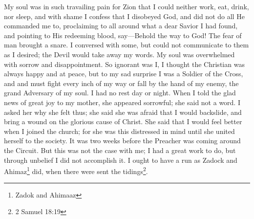 My soul was in such travailing pain for Zion that I could neither work, eat, drink, nor sleep, and with shame I confess that I disobeyed God, and did not do all He commanded me to, proclaiming to all around what a dear Savior I had found, and pointing to His redeeming blood, say---Behold the way to God!
The fear of man brought a snare.
I conversed with some, but could not communicate to them as I desired; the Devil would take away my words.
My soul was overwhelmed with sorrow and disappointment.
So ignorant was I, I thought the Christian was always happy and at peace, but to my sad surprise I was a Soldier of the Cross, and and must fight every inch of my way or fall by the hand of my enemy, the grand Adversary of my soul.
I had no rest day or night.
When I told the glad news of great joy to my mother, she appeared sorrowful; she said not a word.
I asked her why she felt thus; she said she was afraid that I would backslide, and bring a wound on the glorious cause of Christ.
She said that I would feel better when I joined the church; for she was this distressed in mind until she united herself to the society.
It was two weeks before the Preacher was coming around the Circuit.
But this was not the case with me; I had a great work to do, but through unbelief I did not accomplish it.
I ought to have a run as Zadock and Ahimaz\footnote{Zadok and Ahimaaz} did, when there were sent the tidings\footnote{2 Samuel 18:19}.
